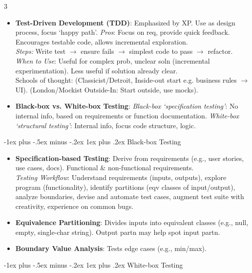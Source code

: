 \documentclass[a4paper, 10pt, landscape]{article}
\makeatletter
\renewcommand{\subsubsection}{\@startsection{subsubsection}{3}{0mm}%
                                {-1ex plus -.5ex minus -.2ex}%
                                {1ex plus .2ex}%
                                {\normalfont\small\bfseries}}
\makeatother
\begin{document}
\begin{multicols*}{3}
\begin{itemize}
    \item \textbf{Test-Driven Development (TDD)}: Emphasized by XP. Use as design process, focus `happy path'. 
    	\textit{Pros}: Focus on req, provide quick feedback. Encourages testable code, allows incremental exploration. 
    	\\ \textit{Steps:} Write test $\rightarrow$ ensure fails $\rightarrow$ simplest code to pass $\rightarrow$ refactor.
	\\ \textit{When to Use}: Useful for complex prob, unclear soln (incremental experimentation). Less useful if solution already clear. \\
	Schools of thought: (Classicist/Detroit, Inside-out start e.g. business rules $\rightarrow$ UI). (London/Mockist Outside-In: Start outside, use mocks).

    \item \textbf{Black-box vs. White-box Testing}: 
    	\textit{Black-box `specification testing'}: No internal info, based on requirements or function documentation.
	\textit{White-box `structural testing'}: Internal info, focus code structure, logic.
\end{itemize}

\subsubsection{Black-box Testing}
\begin{itemize}
    \item \textbf{Specification-based Testing}: Derive from requirements (e.g., user stories, use cases, docs). Functional \& non-functional requirements. \\
	 \textit{Testing Workflow}: Understand requirements (inputs, outputs), explore program (functionality), identify partitions (eqv classes of input/output), analyze boundaries, devise and automate test cases, augment test suite with creativity, experience on common bugs.
    \item \textbf{Equivalence Partitioning}: Divides inputs into equivalent classes (e.g., null, empty, single-char string). Output partn may help spot input partn.
    \item \textbf{Boundary Value Analysis}: Tests edge cases (e.g., min/max).
\end{itemize}

\subsubsection{White-box Testing}


\end{multicols*}
\end{document}
